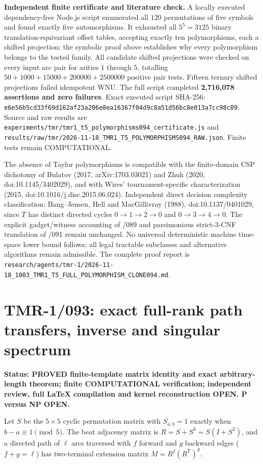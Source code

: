 \documentclass[11pt]{article}
\begin{document}
\noindent\textbf{Independent finite certificate and literature check.}
A locally executed dependency-free Node.js script enumerated all
$120$ permutations of five symbols and found exactly five
automorphisms. It exhausted all $5^5=3125$ binary
translation-equivariant offset tables, accepting exactly ten
polymorphisms, each a shifted projection; the symbolic proof above
establishes why every polymorphism belongs to the tested family.
All candidate shifted projections were checked on every input
arc pair for arities $1$ through $5$, totalling
$50+1000+15000+200000+2500000$ positive pair tests.
Fifteen ternary shifted projections failed idempotent WNU.
The full script completed \textbf{2,716,078 assertions and
zero failures}. Exact executed script SHA-256:
\texttt{e6e56b5cd33f69d162af23a206e8ea16367f04d9c8a51d56bc8e013a7cc98c09}.
Source and raw results are
\texttt{experiments/tmr/tmr1\_t5\_polymorphisms094\_certificate.js}
and
\texttt{results/raw/tmr/2026-11-18\_TMR1\_T5\_POLYMORPHISMS094\_RAW.json}.
Finite tests remain COMPUTATIONAL.

The absence of Taylor polymorphisms is compatible with
the finite-domain CSP dichotomy of Bulatov (2017,
arXiv:1703.03021) and Zhuk (2020, doi:10.1145/3402029),
and with Wires' tournament-specific characterization
(2015, doi:10.1016/j.disc.2015.06.024).
Independent direct decision complexity classification:
Bang--Jensen, Hell and MacGillivray (1988),
doi:10.1137/0401029, since $T$ has distinct directed
cycles $0\to1\to2\to0$ and $0\to3\to4\to0$.
The explicit gadget/witness accounting of /089 and parsimonious
strict-3-CNF translation of /091 remain unchanged.
No universal deterministic machine time-space lower bound follows;
all legal tractable subclasses and alternative algorithms remain
admissible. The complete proof report is
\texttt{research/agents/tmr-1/2026-11-18\_1003\_TMR1\_T5\_FULL\_POLYMORPHISM\_CLONE094.md}.
\par



\section{TMR-1/093: exact full-rank path transfers, inverse and singular spectrum}
\noindent\textbf{Status: PROVED finite-template matrix identity and exact
arbitrary-length theorem; finite COMPUTATIONAL verification; independent
review, full LaTeX compilation and kernel reconstruction OPEN. P versus NP OPEN.}

Let $S$ be the $5\times5$ cyclic permutation matrix with
$S_{a,b}=1$ exactly when $b-a\equiv1\pmod5$.
The beat adjacency matrix is
$R=S+S^3=S(I+S^2)$, and a directed path of $\ell$ arcs
traversed with $f$ forward and $g$ backward edges
($f+g=\ell$) has two-terminal extension matrix
$M=R^f(R^{\mathsf T})^g$.
\end{document}
